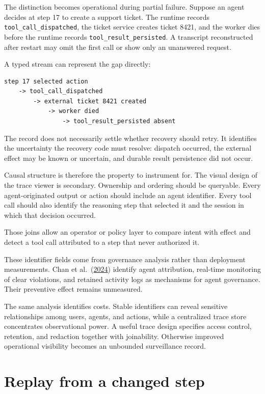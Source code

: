 The distinction becomes operational during partial failure. Suppose an agent decides at step 17 to create a support ticket. The runtime records \texttt{tool\_call\_dispatched}, the ticket service creates ticket 8421, and the worker dies before the runtime records \texttt{tool\_result\_persisted}. A transcript reconstructed after restart may omit the first call or show only an unanswered request.

A typed stream can represent the gap directly:

\begin{verbatim}
step 17 selected action
    -> tool_call_dispatched
        -> external ticket 8421 created
            -> worker died
                -> tool_result_persisted absent
\end{verbatim}

The record does not necessarily settle whether recovery should retry. It identifies the uncertainty the recovery code must resolve: dispatch occurred, the external effect may be known or uncertain, and durable result persistence did not occur.

Causal structure is therefore the property to instrument for. The visual design of the trace viewer is secondary. Ownership and ordering should be queryable. Every agent-originated output or action should include an agent identifier. Every tool call should also identify the reasoning step that selected it and the session in which that decision occurred.

Those joins allow an operator or policy layer to compare intent with effect and detect a tool call attributed to a step that never authorized it.

These identifier fields come from governance analysis rather than deployment measurements. Chan et al.~(\href{https://arxiv.org/abs/2401.13138}{2024}) identify agent attribution, real-time monitoring of clear violations, and retained activity logs as mechanisms for agent governance. Their preventive effect remains unmeasured.

The same analysis identifies costs. Stable identifiers can reveal sensitive relationships among users, agents, and actions, while a centralized trace store concentrates observational power. A useful trace design specifies access control, retention, and redaction together with joinability. Otherwise improved operational visibility becomes an unbounded surveillance record.

\section{Replay from a changed step}\label{replay-from-a-changed-step}

